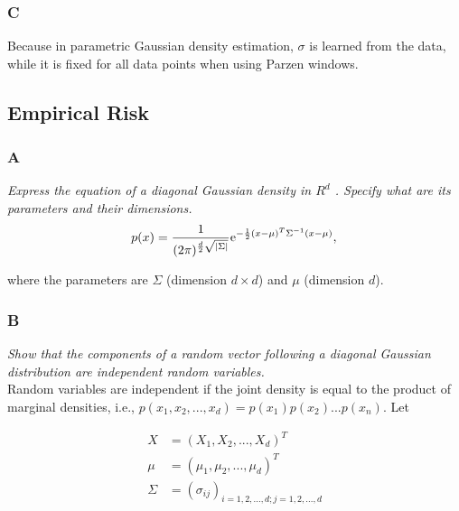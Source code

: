 \documentclass{amsart}
\theoremstyle{definition}
\theoremstyle{remark}
\numberwithin{equation}{section}
\begin{document}
\subsubsection{C} 

Because in parametric Gaussian density estimation, $\sigma$ is learned from 
the data, while it is fixed for all data points when using Parzen windows. \\ 

\subsection{Empirical Risk}

\subsubsection{A} 

\textit{Express the equation of a diagonal Gaussian density in $R^d$ . Specify 
            what are its parameters and their dimensions.} \\

\begin{equation}
    p(x) = \frac{1}{(2\pi)^{\frac{d}{2} \sqrt{|\Sigma|}}} {\rm e}^{-\frac{1}{2}(x-\mu)^T \Sigma^{-1} (x-\mu)}, \\
\end{equation}

where the parameters are $\Sigma$ (dimension $d \times d$) and $\mu$ (dimension $d$). \\

\subsubsection{B}

\textit{Show that the components of a random vector following a diagonal 
        Gaussian distribution are independent random variables.} \\

Random variables are independent if the joint density is equal to the product of
marginal densities, i.e., $p(x_1, x_2, ..., x_d) = p(x_1)p(x_2)...p(x_n)$. Let 

\begin{equation}
    \begin{align}
    X & = (X_1, X_2, ..., X_d)^T \\
    \mu & = (\mu_1, \mu_2, ..., \mu_d)^T \\ 
    \Sigma & = (\sigma_{ij})_{i=1,2,...,d; j=1,2,...,d}
    \end{align}
\end{equation}
\end{document}

